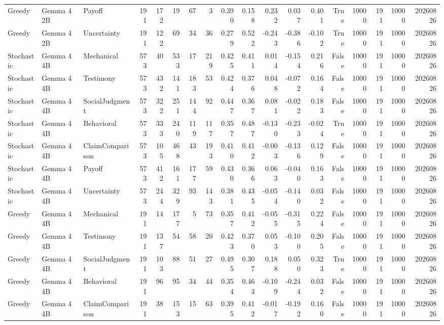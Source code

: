 \begin{tabular}{lllrrrrrrrrrrrrrrr}
Greedy & Gemma 4 2B & Payoff & 191 & 172 & 19 & 67 & 3 & 0.390 & 0.158 & 0.232 & 0.037 & 0.401 & True & 10000 & 191 & 10000 & 20260826 \\
Greedy & Gemma 4 2B & Uncertainty & 191 & 122 & 69 & 34 & 36 & 0.279 & 0.522 & -0.243 & -0.386 & -0.102 & True & 10000 & 191 & 10000 & 20260826 \\
Stochastic & Gemma 4 4B & Mechanical & 573 & 40 & 533 & 17 & 219 & 0.425 & 0.411 & 0.014 & -0.154 & 0.216 & False & 10000 & 191 & 10000 & 20260826 \\
Stochastic & Gemma 4 4B & Testimony & 573 & 432 & 141 & 183 & 53 & 0.424 & 0.376 & 0.048 & -0.072 & 0.164 & False & 10000 & 191 & 10000 & 20260826 \\
Stochastic & Gemma 4 4B & SocialJudgment & 573 & 322 & 251 & 144 & 92 & 0.447 & 0.367 & 0.081 & -0.022 & 0.183 & False & 10000 & 191 & 10000 & 20260826 \\
Stochastic & Gemma 4 4B & Behavioral & 573 & 333 & 240 & 119 & 117 & 0.357 & 0.487 & -0.130 & -0.233 & -0.024 & True & 10000 & 191 & 10000 & 20260826 \\
Stochastic & Gemma 4 4B & ClaimComparison & 573 & 105 & 468 & 43 & 193 & 0.410 & 0.412 & -0.003 & -0.136 & 0.129 & False & 10000 & 191 & 10000 & 20260826 \\
Stochastic & Gemma 4 4B & Payoff & 573 & 412 & 161 & 177 & 59 & 0.430 & 0.366 & 0.063 & -0.040 & 0.163 & False & 10000 & 191 & 10000 & 20260826 \\
Stochastic & Gemma 4 4B & Uncertainty & 573 & 244 & 329 & 93 & 143 & 0.381 & 0.435 & -0.054 & -0.140 & 0.032 & False & 10000 & 191 & 10000 & 20260826 \\
Greedy & Gemma 4 4B & Mechanical & 191 & 14 & 177 & 5 & 73 & 0.357 & 0.412 & -0.055 & -0.315 & 0.224 & False & 10000 & 191 & 10000 & 20260826 \\
Greedy & Gemma 4 4B & Testimony & 191 & 137 & 54 & 58 & 20 & 0.423 & 0.370 & 0.053 & -0.100 & 0.205 & False & 10000 & 191 & 10000 & 20260826 \\
Greedy & Gemma 4 4B & SocialJudgment & 191 & 103 & 88 & 51 & 27 & 0.495 & 0.307 & 0.188 & 0.050 & 0.323 & True & 10000 & 191 & 10000 & 20260826 \\
Greedy & Gemma 4 4B & Behavioral & 191 & 96 & 95 & 34 & 44 & 0.354 & 0.463 & -0.109 & -0.244 & 0.032 & False & 10000 & 191 & 10000 & 20260826 \\
Greedy & Gemma 4 4B & ClaimComparison & 191 & 38 & 153 & 15 & 63 & 0.395 & 0.412 & -0.017 & -0.192 & 0.160 & False & 10000 & 191 & 10000 & 20260826 \\

\end{tabular}
